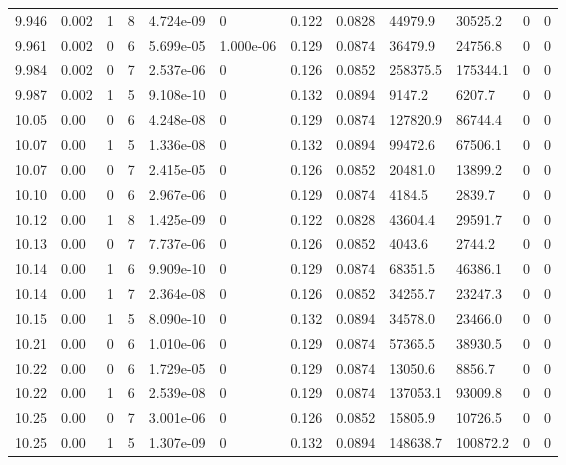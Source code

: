 \documentclass[preview]{standalone}
\begin{document}
{{{{{{{{{{{{\begin{tabular}{L{1.2cm}C{1.2cm} C{0.3cm}C{0.5cm} C{1.4cm}C{1.4cm} C{1.4cm}C{1.4cm} C{1.6cm}C{1.6cm} C{1.6cm}C{1.6cm}}
  9.946  &  0.002  & 1     &  8 &  4.724e-09  & 0  &  0.122&   0.0828& 44979.9 & 30525.2   &  0 & 0  \\ 
  9.961  &  0.002  & 0     &  6 &  5.699e-05  & 1.000e-06  &  0.129&   0.0874& 36479.9 & 24756.8   &  0 & 0  \\ 
  9.984  &  0.002  & 0     &  7 &  2.537e-06  & 0  &  0.126&   0.0852& 258375.5 & 175344.1   &  0 & 0  \\ 
  9.987  &  0.002  & 1     &  5 &  9.108e-10  & 0  &  0.132&   0.0894& 9147.2 & 6207.7   &  0 & 0  \\ 
  10.05  &  0.00  & 0     &  6 &  4.248e-08  & 0  &  0.129&   0.0874& 127820.9 & 86744.4   &  0 & 0  \\ 
  10.07  &  0.00  & 1     &  5 &  1.336e-08  & 0  &  0.132&   0.0894& 99472.6 & 67506.1   &  0 & 0  \\ 
  10.07  &  0.00  & 0     &  7 &  2.415e-05  & 0  &  0.126&   0.0852& 20481.0 & 13899.2   &  0 & 0  \\ 
  10.10  &  0.00  & 0     &  6 &  2.967e-06  & 0  &  0.129&   0.0874& 4184.5 & 2839.7   &  0 & 0  \\ 
  10.12  &  0.00  & 1     &  8 &  1.425e-09  & 0  &  0.122&   0.0828& 43604.4 & 29591.7   &  0 & 0  \\ 
  10.13  &  0.00  & 0     &  7 &  7.737e-06  & 0  &  0.126&   0.0852& 4043.6 & 2744.2   &  0 & 0  \\ 
  10.14  &  0.00  & 1     &  6 &  9.909e-10  & 0  &  0.129&   0.0874& 68351.5 & 46386.1   &  0 & 0  \\ 
  10.14  &  0.00  & 1     &  7 &  2.364e-08  & 0  &  0.126&   0.0852& 34255.7 & 23247.3   &  0 & 0  \\ 
  10.15  &  0.00  & 1     &  5 &  8.090e-10  & 0  &  0.132&   0.0894& 34578.0 & 23466.0   &  0 & 0  \\ 
  10.21  &  0.00  & 0     &  6 &  1.010e-06  & 0  &  0.129&   0.0874& 57365.5 & 38930.5   &  0 & 0  \\ 
  10.22  &  0.00  & 0     &  6 &  1.729e-05  & 0  &  0.129&   0.0874& 13050.6 & 8856.7   &  0 & 0  \\ 
  10.22  &  0.00  & 1     &  6 &  2.539e-08  & 0  &  0.129&   0.0874& 137053.1 & 93009.8   &  0 & 0  \\ 
  10.25  &  0.00  & 0     &  7 &  3.001e-06  & 0  &  0.126&   0.0852& 15805.9 & 10726.5   &  0 & 0  \\ 
  10.25  &  0.00  & 1     &  5 &  1.307e-09  & 0  &  0.132&   0.0894& 148638.7 & 100872.2   &  0 & 0  \\ 

\end{tabular}}}}}}}}}}}}}
\end{document}
